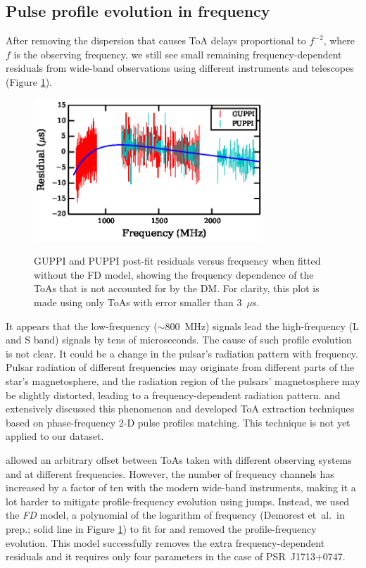 \subsection{Pulse profile evolution in frequency}
\label{sec:FD}
After removing the dispersion that causes ToA delays proportional to $f^{-2}$,
where $f$ is the observing frequency,
 we still see small remaining frequency-dependent residuals from wide-band
observations using
different instruments and telescopes (Figure \ref{fig:FD}). 
%
\begin{figure}
\includegraphics[width=3.4in]{FD.ps} \\ 
\caption {\label{fig:FD} GUPPI and PUPPI post-fit residuals versus frequency when fitted
without the FD model, showing the frequency dependence of the ToAs that is 
not accounted for by the DM. For
clarity, this plot is made using only ToAs with error smaller than 3~$\mu$s.} 
\end{figure} 
% 
It appears that the low-frequency ($\sim$800~MHz) signals lead the
high-frequency (L and S band) signals by tens of microseconds.
The cause of such profile evolution is not clear. It could be a change in the pulsar's
radiation pattern with frequency. Pulsar radiation of different frequencies may originate from
different parts of the star's magnetosphere, and 
the radiation region of the pulsars' magnetosphere may be slightly distorted,
leading to a frequency-dependent radiation pattern. \citet{pdr14} and \citet{ldc+14} 
extensively discussed this phenomenon and developed ToA extraction techniques
based on phase-frequency 2-D pulse profiles matching. This technique is not
yet applied to our dataset.

\citet{sns+05} allowed an arbitrary offset between ToAs taken with different
observing systems and at different frequencies.
However, the number of frequency
channels has increased by a factor of ten with the modern wide-band
instruments, making it a lot harder to mitigate profile-frequency evolution using jumps. 
Instead, we used the {\it FD} model, a polynomial of the logarithm of
frequency (Demorest et~al.\ in prep.; solid line in Figure
\ref{fig:FD}) to fit for and removed the profile-frequency
evolution. This model successfully removes the extra
frequency-dependent residuals and it requires only four parameters in the
case of PSR~J1713+0747.


